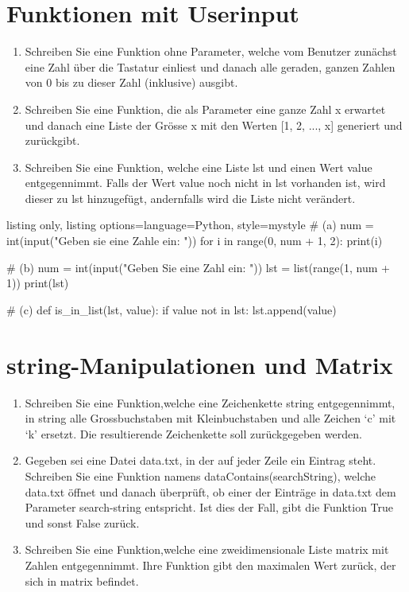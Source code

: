 \documentclass[11pt, oneside]{book}
\begin{document}
\section{Funktionen mit Userinput}
\begin{enumerate}[label=(\alph*)]
    \item Schreiben Sie eine Funktion ohne Parameter, welche vom Benutzer zunächst eine Zahl über die Tastatur einliest und danach alle geraden, ganzen Zahlen von 0 bis zu dieser Zahl (inklusive) ausgibt.
    \item Schreiben Sie eine Funktion, die als Parameter eine ganze Zahl x erwartet und danach eine Liste der Grösse x mit den Werten [1, 2, ..., x] generiert und zurückgibt.
    \item Schreiben Sie eine Funktion, welche eine Liste lst und einen Wert value entgegennimmt. Falls der Wert value noch nicht in lst vorhanden ist, wird dieser zu lst hinzugefügt, andernfalls wird die Liste nicht verändert.
\end{enumerate}

\begin{tcblisting}{listing only, listing options={language=Python, style=mystyle}}
# (a)
num = int(input("Geben sie eine Zahle ein: "))
for i in range(0, num + 1, 2):
    print(i)

# (b)
num = int(input("Geben Sie eine Zahl ein: "))
lst = list(range(1, num + 1))
print(lst)

# (c)
def is_in_list(lst, value):
    if value not in lst:
        lst.append(value)
\end{tcblisting}

\newpage
\section{string-Manipulationen und Matrix}
\begin{enumerate}[label=(\alph*)]
    \item Schreiben Sie eine Funktion,welche eine Zeichenkette string entgegennimmt, in string alle Grossbuchstaben mit Kleinbuchstaben und alle Zeichen ‘c’ mit ‘k’ ersetzt. Die resultierende Zeichenkette soll zurückgegeben werden.
    \item Gegeben sei eine Datei data.txt, in der auf jeder Zeile ein Eintrag steht. Schreiben Sie eine Funktion namens dataContains(searchString), welche data.txt öffnet und danach überprüft, ob einer der Einträge in data.txt dem Parameter search-string entspricht. Ist dies der Fall, gibt die Funktion True und sonst False zurück.
    \item Schreiben Sie eine Funktion,welche eine zweidimensionale Liste matrix mit Zahlen entgegennimmt. Ihre Funktion gibt den maximalen Wert zurück, der sich in matrix befindet.
\end{enumerate}
\end{document}
